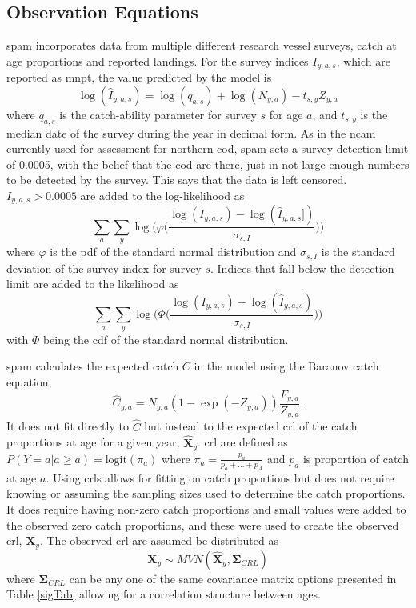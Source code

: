 \documentclass[11pt]{article}\usepackage[]{graphicx}\usepackage[]{color}
\begin{document}
\subsection{Observation Equations}
\acrshort{spam} incorporates data from multiple different research vessel surveys, catch at age proportions and reported landings. For the survey indices $I_{y,a,s}$, which are reported as \acrfull{mnpt}, the value predicted by the model is 
\begin{equation}
  \log(\hat{I}_{y,a,s}) = \log(q_{a,s}) + \log(N_{y,a}) - t_{s,y}Z_{y,a}
\end{equation}
where $q_{a,s}$ is the catch-ability parameter for survey $s$ for age $a$, and $t_{s,y}$ is the median date of the survey during the year in decimal form. As in the \acrfull{ncam} currently used for assessment for northern cod, \acrshort{spam} sets a survey detection limit of 0.0005, with the belief that the cod are there, just in not large enough numbers to be detected by the survey\cite{Cadigan2016A-state-space-s}. This says that the data is left censored. $I_{y,a,s} > 0.0005$ are added to the log-likelihood as
\begin{equation}
  \sum_a\sum_y \log\bigg(\varphi\bigg(\frac{\log(I_{y,a,s})-\log(\hat{I}_{y,a,s}])}{\sigma_{s,I}	}\bigg)\bigg)
\end{equation}
where $\varphi$ is the \acrshort{pdf} of the standard normal distribution and $\sigma_{s,I}$ is the standard deviation of the survey index for survey $s$. Indices that fall below the detection limit are added to the likelihood as
\begin{equation}\label{surBound}
  \sum_a\sum_y \log\bigg(\Phi\bigg(\frac{\log(I_{y,a,s})-\log(\hat{I}_{y,a,s})}{\sigma_{s,I}	}\bigg)\bigg)	
\end{equation}
with $\Phi$ being the \acrfull{cdf} of the standard normal distribution.

\acrshort{spam} calculates the expected catch $C$ in the model using the Baranov catch equation,
\begin{equation}
  \hat{C}_{y,a} = N_{y,a}(1-\exp(-Z_{y,a}))\frac{F_{y,a}}{Z_{y,a}}.
\end{equation}
It does not fit directly to $\hat{C}$ but instead to the expected \acrfull{crl} of the catch proportions at age for a given year, $\bm{\hat{X}}_y$. \acrshort{crl} are defined as $P(Y = a | a \geq a) = \text{logit}(\pi_a)$ where $\pi_a = \frac{p_a}{p_a+\dots+p_A}$ and $p_a$ is proportion of catch at age $a$. Using \acrshort{crl}s allows for fitting on catch proportions but does not require knowing or assuming the sampling sizes used to determine the catch proportions. It does require having non-zero catch proportions and small values were added to the observed zero catch proportions, and these were used to create the observed \acrshort{crl}, $\bm{X}_y$. The observed \acrshort{crl} are assumed be distributed as
\begin{equation}
  \bm{X}_y \sim MVN(\hat{\bm{X}}_y,\bm{\Sigma}_{CRL})
\end{equation}
where $\bm{\Sigma}_{CRL}$ can be any one of the same covariance matrix options presented in Table \ref{sigTab} allowing for a correlation structure between ages.
\end{document}
